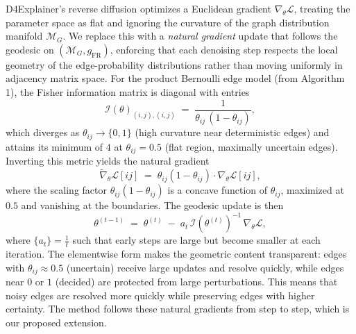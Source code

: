 \documentclass[11pt]{article}
\begin{document}
D4Explainer's reverse diffusion optimizes a Euclidean gradient
$\nabla_\theta \mathcal{L}$, treating the parameter space as flat and
ignoring the curvature of the graph distribution manifold $\mathcal{M}_G$.
We replace this with a \emph{natural gradient} update that follows the
geodesic on $(\mathcal{M}_G, g_{\mathrm{FR}})$, enforcing that each
denoising step respects the local geometry of the edge-probability
distributions rather than moving uniformly in adjacency matrix space.
\newline\newline
For the product Bernoulli edge model (from Algorithm 1), the Fisher information matrix is
diagonal with entries
$$
    \mathcal{I}(\theta)_{(i,j),(i,j)}
    \;=\;
    \frac{1}{\theta_{ij}\,(1 - \theta_{ij})},
$$
which diverges as $\theta_{ij} \to \{0, 1\}$ (high curvature near
deterministic edges) and attains its minimum of $4$ at
$\theta_{ij} = 0.5$ (flat region, maximally uncertain edges).
Inverting this metric yields the natural gradient
$$
    \widetilde{\nabla}_\theta \mathcal{L}[ij]
    \;=\;
    \theta_{ij}(1 - \theta_{ij})\cdot \nabla_\theta \mathcal{L}[ij],
$$
where the scaling factor $\theta_{ij}(1 - \theta_{ij})$ is a concave
function of $\theta_{ij}$, maximized at $0.5$ and vanishing at the
boundaries. The geodesic update is then
$$
    \theta^{(t-1)}
    \;=\;
    \theta^{(t)}
    \;-\;
    a_t\,\mathcal{I}(\theta^{(t)})^{-1}\,\nabla_\theta \mathcal{L},
$$
where $\{a_t\}= \frac{1}{t}$ such that early steps are large but become smaller at each iteration.
The elementwise form makes the geometric content transparent: edges with
$\theta_{ij} \approx 0.5$ (uncertain) receive large updates and resolve
quickly, while edges near $0$ or $1$ (decided) are protected from large
perturbations. This means that noisy edges are resolved more quickly while preserving edges with higher certainty. The method follows these natural gradients from step to step, which is our proposed extension.
\end{document}
